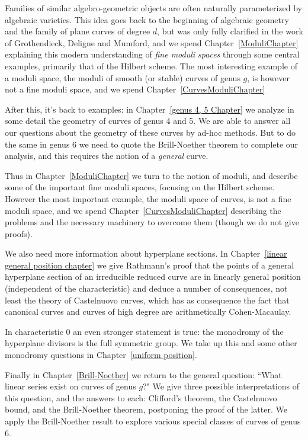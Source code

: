Families of similar algebro-geometric objects are often naturally parameterized by algebraic varieties. This idea goes back to the beginning of algebraic geometry and the family of plane curves of degree $d$, but was only fully clarified in the work of Grothendieck, Deligne and Mumford, and we spend Chapter~\ref{ModuliChapter} explaining this modern understanding of \emph{fine moduli spaces} through some central examples, primarily that of
the Hilbert scheme. The most interesting example of a moduli space, the moduli of smooth (or stable) curves of genus $g$, is however not a fine moduli space, and we spend Chapter~\ref{CurvesModuliChapter}

After this, it's back to examples: in Chapter~\ref{genus 4, 5 Chapter} we analyze in some detail the geometry of curves of genus 4 and 5. We are able to answer all our questions about the geometry of these curves by ad-hoc methods. But to do the same  in genus 6 we need to quote the Brill-Noether theorem to complete our analysis, and this requires the notion of a \emph{general} curve. 

Thus in Chapter~\ref{ModuliChapter} we turn to the notion of moduli, and describe some of the important fine moduli spaces, focusing
on the Hilbert scheme. However the most important example, the moduli space of curves, is not a fine moduli space, and we spend
Chapter~\ref{CurvesModuliChapter} describing the problems and the necessary machinery to overcome them (though we do not give
proofs).

We also need more information about hyperplane sections. In Chapter~\ref{linear general position chapter} we give Rathmann's proof that
the points of a general hyperplane section of an irreducible reduced curve are in linearly general position (independent of the characteristic)
and deduce a number of consequences, not least the theory of Castelnuovo curves, which has as consequence the 
fact that canonical curves and curves of high degree are arithmetically Cohen-Macaulay.

In characteristic 0 an even stronger statement is true: the monodromy of the hyperplane divisors is the full symmetric group. We take up this
and some other monodromy questions in Chapter~\ref{uniform position}.

Finally in Chapter~\ref{Brill-Noether} we return to the general question: ``What linear series exist on curves of genus $g$?" We give three possible interpretations of this question, and the answers to each: Clifford's theorem, the Castelnuovo bound, and the Brill-Noether theorem, postponing the proof of the latter. We apply the Brill-Noether result to explore  various special classes of curves of genus 6.

